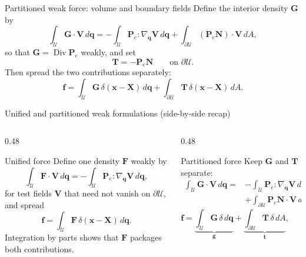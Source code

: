 \documentclass[aspectratio=169,11pt]{beamer}
\newcommand{\xvec}{\bm{x}}
\newcommand{\Xvec}{\bm{q}}
\newcommand{\chivec}{\bm{X}}
\newcommand{\fvec}{\bm{f}}
\newcommand{\Fvec}{\bm{F}}
\newcommand{\Pten}{\bm{P}_{e}}
\newcommand{\Nvec}{\bm{N}}
\begin{document}
\begin{frame}{Partitioned weak force: volume and boundary fields}
Define the interior density \(\bm G\) by
\[
  \int_{\mathcal U}\bm G\cdot\bm V\,d\Xvec
  =-\int_{\mathcal U}\Pten:\nabla_{\!\Xvec}\bm V\,d\Xvec
  +\int_{\partial\mathcal U}(\Pten\Nvec)\cdot\bm V\,dA,
\]
so that \(\bm G=\operatorname{Div}\Pten\) weakly, and set
\[
  \bm T=-\Pten\Nvec\qquad\text{on }\partial\mathcal U .
\]
Then spread the two contributions separately:
\[
  \fvec
  =\int_{\mathcal U}\bm G\,\delta(\xvec-\chivec)\,d\Xvec
  +\int_{\partial\mathcal U}\bm T\,\delta(\xvec-\chivec)\,dA .
\]
\end{frame}

\begin{frame}{Unified and partitioned weak formulations (side-by-side recap)}
\small
{}\par\smallskip
\begin{columns}[T,onlytextwidth]
  \begin{column}{0.48\textwidth}
  \begin{block}{Unified force}
  Define one density \(\Fvec\) weakly by
  \[
    \int_{\mathcal U}\Fvec\cdot\bm{V}\,d\Xvec
    =-\int_{\mathcal U}\Pten:\nabla_{\!\Xvec}\bm{V}\,d\Xvec,
  \]
  for test fields \(\bm{V}\) that need not vanish on \(\partial\mathcal U\), and spread
  \[
    \fvec=\int_{\mathcal U}\Fvec\,\delta(\xvec-\chivec)\,d\Xvec.
  \]
  Integration by parts shows that \(\Fvec\) packages both contributions.
  \end{block}
  \end{column}
  \begin{column}{0.48\textwidth}
  \begin{block}{Partitioned force}
  Keep \(\bm{G}\) and \(\bm{T}\) separate:
  \[
    \begin{aligned}
    \int_{\mathcal U}\bm{G}\cdot\bm{V}\,d\Xvec
    ={}&-\int_{\mathcal U}\Pten:\nabla_{\!\Xvec}\bm{V}\,d\Xvec\\
    &+\int_{\partial\mathcal U}\Pten\Nvec\cdot\bm{V}\,dA,
    \end{aligned}
  \]
  \[
    \fvec=\underbrace{\int_{\mathcal U}\bm{G}\,\delta\,d\Xvec}_{\bm{g}}
    +\underbrace{\int_{\partial\mathcal U}\bm{T}\,\delta\,dA}_{\bm{t}},
    \qquad \bm{T}=-\Pten\Nvec.
  \]
  \end{block}
  \end{column}
\end{columns}
\end{frame}
\end{document}
